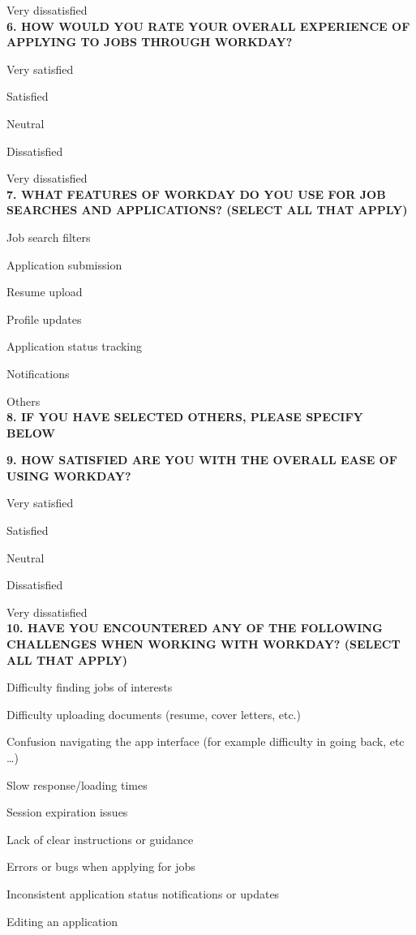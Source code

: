 \documentclass[
	letterpaper, %
]{jdf}
\begin{document}
\begin{sloppypar}
Very dissatisfied \\



\textbf{6. HOW WOULD YOU RATE YOUR OVERALL EXPERIENCE OF APPLYING TO JOBS THROUGH WORKDAY?}

Very satisfied

Satisfied

Neutral

Dissatisfied

Very dissatisfied \\

\textbf{7. WHAT FEATURES OF WORKDAY DO YOU USE FOR JOB SEARCHES AND APPLICATIONS? (SELECT ALL THAT APPLY) }

Job search filters

Application submission

Resume upload

Profile updates

Application status tracking

Notifications

Others \\

\textbf{8. IF YOU HAVE SELECTED OTHERS, PLEASE SPECIFY BELOW
}

\textbf{9. HOW SATISFIED ARE YOU WITH THE OVERALL EASE OF USING WORKDAY?}

Very satisfied

Satisfied

Neutral

Dissatisfied

Very dissatisfied \\

\textbf{10. HAVE YOU ENCOUNTERED ANY OF THE FOLLOWING CHALLENGES WHEN WORKING WITH WORKDAY? (SELECT ALL THAT APPLY)
}

Difficulty finding jobs of interests

Difficulty uploading documents (resume, cover letters, etc.)

Confusion navigating the app interface (for example difficulty in going back, etc …)

Slow response/loading times

Session expiration issues

Lack of clear instructions or guidance

Errors or bugs when applying for jobs

Inconsistent application status notifications or updates

Editing an application


\end{sloppypar}
\end{document}
